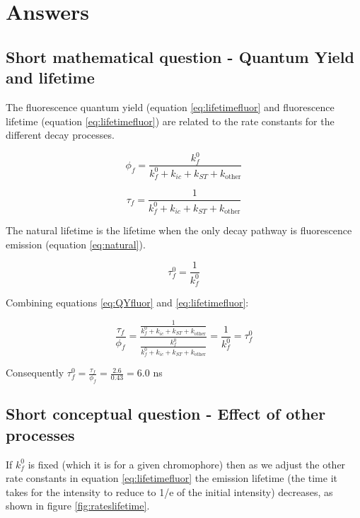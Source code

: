 \documentclass[
]{book}
\begin{document}
\hypertarget{sec:fluorescenceanswers}{%
\section{Answers}\label{sec:fluorescenceanswers}}

\hypertarget{sec:YieldLifetimeans}{%
\subsection{Short mathematical question - Quantum Yield and lifetime}\label{sec:YieldLifetimeans}}

The fluorescence quantum yield (equation \eqref{eq:lifetimefluor} and fluorescence lifetime (equation \eqref{eq:lifetimefluor}) are related to the rate constants for the different decay processes.

\begin{equation}
\phi_f = \frac{k_f^0}{k_f^0+k_{ic}+ k_{ST}+k_{\textrm{other}}}
\label{eq:QYfluor}
\end{equation}

\begin{equation}
\tau_f = \frac{1}{k_f^0+k_{ic}+ k_{ST}+k_{\textrm{other}}}
\label{eq:lifetimefluor}
\end{equation}

The natural lifetime is the lifetime when the only decay pathway is fluorescence emission (equation \eqref{eq:natural}).

\begin{equation}
\tau_f^0 = \frac{1}{k_f^0}
\label{eq:natural}
\end{equation}

Combining equations \eqref{eq:QYfluor} and \eqref{eq:lifetimefluor}:

\begin{equation*}
\frac{\tau_f}{\phi_f}=\frac{\frac{1}{k_f^0+k_{ic}+ k_{ST}+k_{\textrm{other}}}}{\frac{k_f^0}{k_f^0+k_{ic}+ k_{ST}+k_{\textrm{other}}}}=\frac{1}{k_f^0}=\tau_f^0
\end{equation*}

Consequently \(\tau_f^0 = \frac{\tau_f}{\phi_f}=\frac{2.6}{0.43}= 6.0\) ns

\hypertarget{sec:otherprocessesans}{%
\subsection{Short conceptual question - Effect of other processes}\label{sec:otherprocessesans}}

If \(k_f^0\) is fixed (which it is for a given chromophore) then as we adjust the other rate constants in equation \eqref{eq:lifetimefluor} the emission lifetime (the time it takes for the intensity to reduce to 1/e of the initial intensity) decreases, as shown in figure \ref{fig:rateslifetime}.
\end{document}
